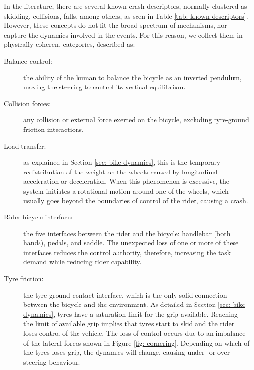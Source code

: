 \documentclass{article}
\begin{document}


In the literature, there are several known crash descriptors, normally clustered as skidding, collisions, falls, among others, as seen in Table \ref{tab: known descriptors}.
%
However, these concepts do not fit the broad spectrum of mechanisms, nor capture the dynamics involved in the events.
%
For this reason, we collect them in physically-coherent categories, described as:
%
\begin{description}
    \item [Balance control:] the ability of the human to balance the bicycle as an inverted pendulum, moving the steering to control its vertical equilibrium.
    \item [Collision forces:] any collision or external force exerted on the bicycle, excluding tyre-ground friction interactions.
    \item [Load transfer:] as explained in Section \ref{sec: bike dynamics}, this is the temporary redistribution of the weight on the wheels caused by longitudinal acceleration or deceleration.
    When this phenomenon is excessive, the system initiates a rotational motion around one of the wheels, which usually goes beyond the boundaries of control of the rider, causing a crash.
    \item [Rider-bicycle interface:] the five interfaces between the rider and the bicycle: handlebar (both hands), pedals, and saddle. 
    The unexpected loss of one or more of these interfaces reduces the control authority, therefore, increasing the task demand while reducing rider capability.
    \item [Tyre friction:] the tyre-ground contact interface, which is the only solid connection between the bicycle and the environment.
    As detailed in Section \ref{sec: bike dynamics}, tyres have a saturation limit for the grip available.
    Reaching the limit of available grip implies that tyres start to skid and the rider loses control of the vehicle. 
    The loss of control occurs due to an imbalance of the lateral forces shown in Figure \ref{fig: cornering}.
    Depending on which of the tyres loses grip, the dynamics will change, causing under- or over-steering behaviour.
\end{description}
\end{document}
